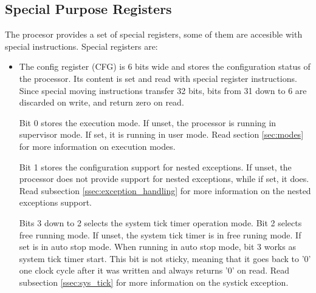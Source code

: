 \subsection{Special Purpose Registers}
\label{ssec:sprs}
The procesor provides a set of special registers, some of them are accesible with special instructions. Special registers are:
\begin{itemize}
   \item The config register (CFG) is 6 bits wide and stores the configuration status of the processor. Its content is set and read with
         special register instructions. Since special moving instructions transfer 32 bits, bits from 31 down to 6 are discarded on write,
         and return zero on read.

         Bit 0 stores the execution mode. If unset, the processor is running in supervisor mode. If set, it is running in user mode.
         Read section \ref{sec:modes} for more information on execution modes.

         Bit 1 stores the configuration support for nested exceptions. If unset, the processor does not provide support for nested exceptions,
         while if set, it does.
         Read subsection \ref{ssec:exception_handling} for more information on the nested exceptions support.

         Bits 3 down to 2 selects the system tick timer operation mode. Bit 2 selects free running mode. If unset, the system tick timer is in free runing mode. If set
         is in auto stop mode. When running in auto stop mode, bit 3 works as system tick timer start. This bit is not sticky, meaning that it goes back to '0' one
         clock cycle after it was written and always returns '0' on read.
         Read subsection \ref{ssec:sys_tick} for more information on the systick exception.


\end{itemize}
